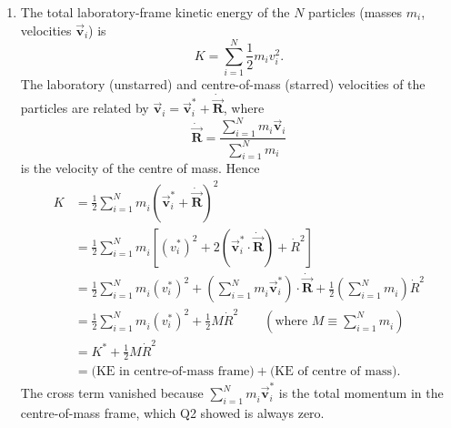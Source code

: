 \documentclass[12pt]{article}
\begin{document}
\begin{enumerate}
\item The total laboratory-frame kinetic energy of the $N$ particles
  (masses $m_i$, velocities $\vec{\boldsymbol{v}}_i$) is
  \begin{displaymath}
    K = \sum_{i=1}^{N} \frac{1}{2} m_i v_i^2 .
  \end{displaymath}
  The laboratory (unstarred) and centre-of-mass (starred) velocities of
  the particles are related by $\vec{\boldsymbol{v}}_i^{\phantom{}} = \vec{\boldsymbol{v}}_i^{\ast} +
  \dot{\vec{\boldsymbol{R}}}$, where
  \begin{displaymath}
    \dot{\vec{\boldsymbol{R}}} = \frac{\sum_{i=1}^{N} m_i \vec{\boldsymbol{v}}_i}{\sum_{i=1}^{N} m_i}
  \end{displaymath}
  is the velocity of the centre of mass. Hence
  \begin{align*}
    K &= \frac{1}{2} \sum_{i=1}^{N} m_i^{\phantom{}} 
        \left ( \vec{\boldsymbol{v}}_i^{\ast} + \dot{\vec{\boldsymbol{R}}} \right )^2 \\
      &= \frac{1}{2} \sum_{i=1}^{N} m_i^{\phantom{}} \left [  
        \left ( v_i^{\ast} \right)^2 + 
        2 (\vec{\boldsymbol{v}}_i^{\ast}\cdot \dot{\vec{\boldsymbol{R}}}) + \dot{R}^2 \right ] \\
      &= \frac{1}{2} \sum_{i=1}^{N} m_i^{\phantom{}} 
        \left ( v_i^{\ast}\right )^2  
        + \left ( \sum_{i=1}^{N} m_i^{\phantom{}} \vec{\boldsymbol{v}}_i^{\ast} \right ) 
        \cdot \dot{\vec{\boldsymbol{R}}}
        + \frac{1}{2} \left ( \sum_{i=1}^{N} m_i^{\phantom{}} \right ) 
        \dot{R}^2 \\
      &= \frac{1}{2}\sum_{i=1}^{N} m_i^{\phantom{}} 
        \left ( v_i^{\ast} \right )^2 + \frac{1}{2} M \dot{R}^2 
        \qquad (\text{where } M \equiv \sum_{i=1}^{N} m_i^{\phantom{}}) \\
      &= K^{\ast} + \frac{1}{2} M \dot{R}^2 \\
      &= \text{(KE in centre-of-mass frame)} + \text{(KE of centre of mass)}.
  \end{align*}
  The cross term vanished because $\sum_{i=1}^{N} m_i^{\phantom{}}
  \vec{\boldsymbol{v}}_i^{\ast}$ is the total momentum in the centre-of-mass frame, which
  Q2 showed is always zero.


\end{enumerate}
\end{document}
